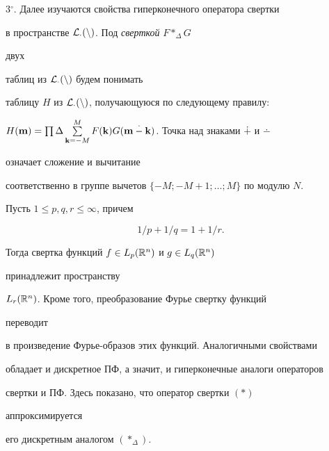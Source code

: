  


3${}^\circ$. Далее изучаются свойства гиперконечного оператора свертки 


в пространстве $\cal L_\Delta(n)$. Под {\it сверткой} $F*_\Delta G$ 


двух 


таблиц из $\cal L_\Delta(n)$ будем понимать 


таблицу $H$ из $\cal L_\Delta(n)$, получающуюся по следующему правилу: 


$H(\bold m)=\prod\Delta\sum\limits^M_{\bold k=-M}F(\bold k)G(\bold 


m\dotminus\bold k)$. Точка над знаками $\dotplus$ и $\dotminus$ 


означает сложение и вычитание 


соответственно в группе вычетов $\{-M;-M+1;\dotsc;M\}$ по модулю $N$. 


 


Пусть $1\le p,q,r\le\infty$, причем 


\begin{equation} 


1/p+1/q=1+1/r. 


\end{equation} 


Тогда свертка функций $f\in L_p(\Bbb R^n)$ и $g\in L_q(\Bbb R^n)$ 


принадлежит пространству 


$L_r(\Bbb R^n)$. Кроме того, преобразование Фурье свертку функций 


переводит 


в произведение Фурье-образов этих функций. Аналогичными свойствами 


обладает и дискретное ПФ, а значит, и гиперконечные аналоги операторов 


свертки и ПФ. Здесь показано, что оператор свертки $(*)$ 


аппроксимируется 


его дискретным аналогом $(*_\Delta)$. 


 


